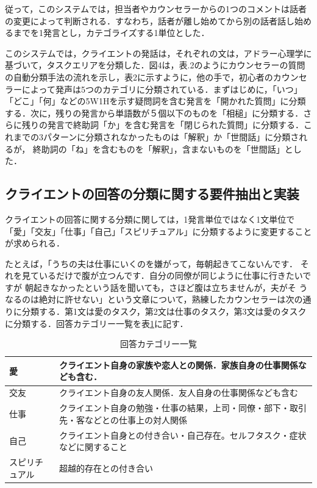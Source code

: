 \documentclass[shuuron]{kuee}
\begin{document}
従って，このシステムでは，担当者やカウンセラーからの1つのコメントは話者の変更によって判断される．すなわち，話者が離し始めてから別の話者話し始めるまでを1発言とし，カテゴライズする1単位とした．

このシステムでは，クライエントの発話は，それぞれの文は，アドラー心理学に基づいて，タスクエリアを分類した．図4は，表.2のようにカウンセラーの質問の自動分類手法の流れを示し，表2に示すように，他の手で，初心者のカウンセラーによって発声は5つのカテゴリに分類されている．まずはじめに，「いつ」「どこ」「何」などの5W1Hを示す疑問詞を含む発言を「開かれた質問」に分類する．次に，残りの発言から単語数が５個以下のものを「相槌」に分類する．さらに残りの発言で終助詞「か」を含む発言を「閉じられた質問」に分類する．これまでの3パターンに分類されなかったものは「解釈」か「世間話」に分類されるが，
終助詞の「ね」を含むものを「解釈」，含まないものを「世間話」とした．


\subsection{クライエントの回答の分類に関する要件抽出と実装}



クライエントの回答に関する分類に関しては，1発言単位ではなく1文単位で「愛」「交友」「仕事」「自己」「スピリチュアル」に分類するように変更することが求められる．

たとえば，「うちの夫は仕事にいくのを嫌がって，毎朝起きてこないんです．
それを見ているだけで腹が立つんです．自分の同僚が同じように仕事に行きたいですが
朝起きなかったという話を聞いても，さほど腹は立ちませんが，夫がそ
うなるのは絶対に許せない」という文章について，熟練したカウンセラーは次の通りに分類する．第1文は愛のタスク，第2文は仕事のタスク，第3文は愛のタスクに分類する．回答カテゴリー一覧を表\ref{table:ansCate}に記す．

\begin{table}
  \caption{回答カテゴリー一覧}
  \label{table:ansCate}
  \begin{center}
    \begin{tabular}{|l|p{7cm}|} \hline
      愛 & クライエント自身の家族や恋人との関係．家族自身の仕事関係なども含む．
      \\ \hline
      交友  & クライエント自身の友人関係．友人自身の仕事関係なども含む
      \\ \hline
      仕事 & クライエント自身の勉強・仕事の結果，上司・同僚・部下・取引先・客などとの仕事上の対人関係
      \\ \hline
      自己  &  クライエント自身との付き合い・自己存在。セルフタスク・症状などに関すること
      \\ \hline
      スピリチュアル & 超越的存在との付き合い
      \\ \hline
    \end{tabular}
  \end{center}
\end{table}
\end{document}
